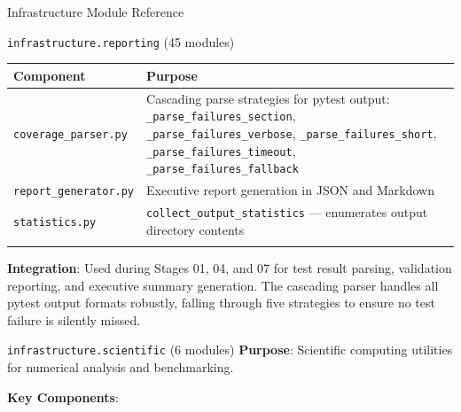 \documentclass[
  ignorenonframetext,
]{beamer}
\newcounter{none} %
\begin{document}
\begin{frame}[fragile]{Infrastructure Module Reference}
\begin{block}{\texttt{infrastructure.reporting} (45 modules)}
{\def\LTcaptype{none} %
\begin{longtable}[]{@{}
  >{\raggedright\arraybackslash}p{}
  >{\raggedright\arraybackslash}p{}@{}}
\toprule\noalign{}
\begin{minipage}[b]{\linewidth}\raggedright
Component
\end{minipage} & \begin{minipage}[b]{\linewidth}\raggedright
Purpose
\end{minipage} \\
\midrule\noalign{}
\endhead
\texttt{coverage\_parser.py} & Cascading parse strategies for pytest
output: \texttt{\_parse\_failures\_section},
\texttt{\_parse\_failures\_verbose}, \texttt{\_parse\_failures\_short},
\texttt{\_parse\_failures\_timeout},
\texttt{\_parse\_failures\_fallback} \\
\texttt{report\_generator.py} & Executive report generation in JSON and
Markdown \\
\texttt{statistics.py} & \texttt{collect\_output\_statistics} ---
enumerates output directory contents \\
\bottomrule\noalign{}
\end{longtable}
}

\textbf{Integration}: Used during Stages 01, 04, and 07 for test result
parsing, validation reporting, and executive summary generation. The
cascading parser handles all pytest output formats robustly, falling
through five strategies to ensure no test failure is silently missed.
\end{block}

\begin{block}{\texttt{infrastructure.scientific} (6 modules)}
\protect{}\label{infrastructure.scientific-6-modules}
\textbf{Purpose}: Scientific computing utilities for numerical analysis
and benchmarking.

\textbf{Key Components}:


\end{block}
\end{frame}
\end{document}
